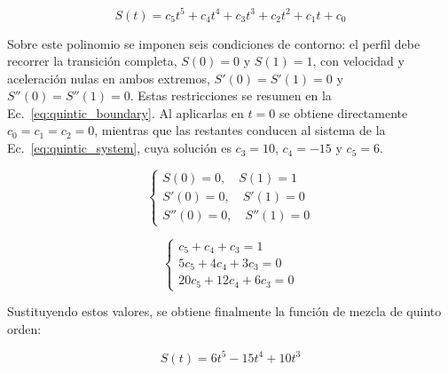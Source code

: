 \vspace{-1\baselineskip}
\setlength{\abovedisplayskip}{0pt}
\setlength{\abovedisplayshortskip}{0pt}
\begin{equation}
    S(t) = c_5t^5 + c_4t^4 + c_3t^3 + c_2t^2 + c_1t + c_0
    \label{eq:quintic_poly_general}
\end{equation}
\vspace{-1.5\baselineskip}

Sobre este polinomio se imponen seis condiciones de contorno: el perfil debe recorrer la transición completa, $S(0)=0$ y $S(1)=1$, con velocidad y aceleración nulas en ambos extremos, $S'(0)=S'(1)=0$ y $S''(0)=S''(1)=0$. Estas restricciones se resumen en la Ec.~\ref{eq:quintic_boundary}. Al aplicarlas en $t=0$ se obtiene directamente $c_0=c_1=c_2=0$, mientras que las restantes conducen al sistema de la Ec.~\ref{eq:quintic_system}, cuya solución es $c_3=10$, $c_4=-15$ y $c_5=6$.

\vspace{-1\baselineskip}
\noindent
\begin{minipage}[t]{0.55\textwidth}
    \begin{equation}
    \begin{cases}
        S(0) = 0, \quad S(1) = 1 \\
        S'(0) = 0, \quad S'(1) = 0 \\
        S''(0) = 0, \quad S''(1) = 0
    \end{cases}
    \label{eq:quintic_boundary}
\end{equation}
    \end{minipage}
\hfill
\begin{minipage}[t]{0.43\textwidth}
    \begin{equation}
    \begin{cases}
        c_5 + c_4 + c_3 = 1 \\
        5c_5 + 4c_4 + 3c_3 = 0 \\
        20c_5 + 12c_4 + 6c_3 = 0
    \end{cases}
    \label{eq:quintic_system}
\end{equation}
    \end{minipage}

Sustituyendo estos valores, se obtiene finalmente la función de mezcla de quinto orden:

\vspace{-1\baselineskip}
\begin{equation}
    S(t) = 6t^5 - 15t^4 + 10t^3
    \label{eq:smootherstep_poly}
\end{equation}
\vspace{-1.5\baselineskip}

